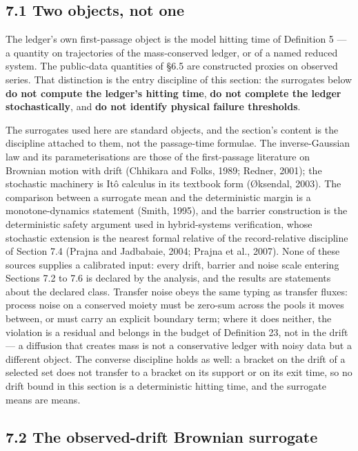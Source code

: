 \documentclass[11pt]{article}
\begin{document}
\subsection*{7.1 Two objects, not one}\label{71-two-objects-not-one}

The ledger's own first-passage object is the model hitting time of Definition 5 --- a quantity on trajectories of the mass-conserved ledger, or of a named reduced system. The public-data quantities of \S6.5 are constructed proxies on observed series. That distinction is the entry discipline of this section: the surrogates below \textbf{do not compute the ledger's hitting time}, \textbf{do not complete the ledger stochastically}, and \textbf{do not identify physical failure thresholds}.

The surrogates used here are standard objects, and the section's content is the discipline attached to them, not the passage-time formulae. The inverse-Gaussian law and its parameterisations are those of the first-passage literature on Brownian motion with drift (Chhikara and Folks, 1989; Redner, 2001); the stochastic machinery is It\^{o} calculus in its textbook form (\O{}ksendal, 2003). The comparison between a surrogate mean and the deterministic margin is a monotone-dynamics statement (Smith, 1995), and the barrier construction is the deterministic safety argument used in hybrid-systems verification, whose stochastic extension is the nearest formal relative of the record-relative discipline of Section 7.4 (Prajna and Jadbabaie, 2004; Prajna et al., 2007). None of these sources supplies a calibrated input: every drift, barrier and noise scale entering Sections 7.2 to 7.6 is declared by the analysis, and the results are statements about the declared class. Transfer noise obeys the same typing as transfer fluxes: process noise on a conserved moiety must be zero-sum across the pools it moves between, or must carry an explicit boundary term; where it does neither, the violation is a residual and belongs in the budget of Definition 23, not in the drift --- a diffusion that creates mass is not a conservative ledger with noisy data but a different object. The converse discipline holds as well: a bracket on the drift of a selected set does not transfer to a bracket on its support or on its exit time, so no drift bound in this section is a deterministic hitting time, and the surrogate means are means.

\subsection*{7.2 The observed-drift Brownian surrogate}\label{72-the-observed-drift-brownian-surrogate}
\end{document}
